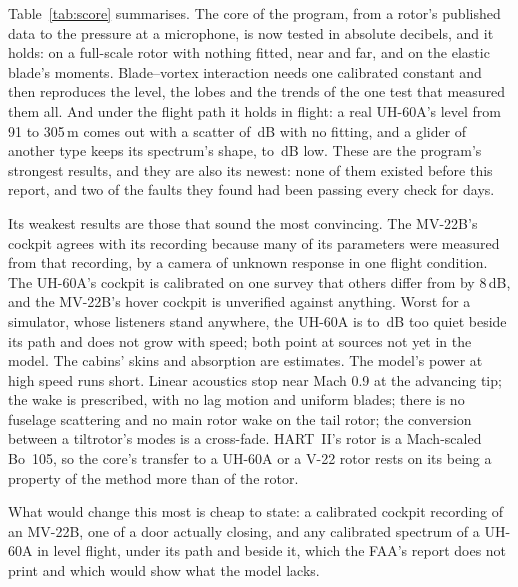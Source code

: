 \documentclass[10pt,a4paper,twocolumn]{article}
\begin{document}
Table~\ref{tab:score} summarises. The core of the program, from a rotor's published data to the pressure at a microphone, is now tested in absolute decibels, and it holds: on a full-scale rotor with nothing fitted, near and far, and on the elastic blade's moments. Blade--vortex interaction needs one calibrated constant and then reproduces the level, the lobes and the trends of the one test that measured them all. And under the flight path it holds in flight: a real UH-60A's level from 91 to 305\,m comes out with a scatter of \NFlLevelSd\,dB with no fitting, and a glider of another type keeps its spectrum's shape, \NPrLo{} to \NPrHi\,dB low. These are the program's strongest results, and they are also its newest: none of them existed before this report, and two of the faults they found had been passing every check for days.

Its weakest results are those that sound the most convincing. The MV-22B's cockpit agrees with its recording because many of its parameters were measured from that recording, by a camera of unknown response in one flight condition. The UH-60A's cockpit is calibrated on one survey that others differ from by 8\,dB, and the MV-22B's hover cockpit is unverified against anything. Worst for a simulator, whose listeners stand anywhere, the UH-60A is \NFlSideLo{} to \NFlSideHi\,dB too quiet beside its path and does not grow with speed; both point at sources not yet in the model. The cabins' skins and absorption are estimates. The model's power at high speed runs short. Linear acoustics stop near Mach 0.9 at the advancing tip; the wake is prescribed, with no lag motion and uniform blades; there is no fuselage scattering and no main rotor wake on the tail rotor; the conversion between a tiltrotor's modes is a cross-fade. HART~II's rotor is a Mach-scaled Bo~105, so the core's transfer to a UH-60A or a V-22 rotor rests on its being a property of the method more than of the rotor.

What would change this most is cheap to state: a calibrated cockpit recording of an MV-22B, one of a door actually closing, and any calibrated spectrum of a UH-60A in level flight, under its path and beside it, which the FAA's report does not print and which would show what the model lacks.

\end{document}
